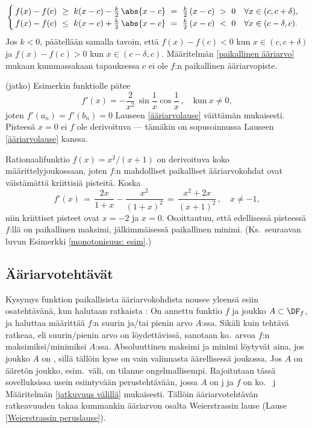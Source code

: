 \[
\begin{cases}
\,f(x)-f(c)\ \ge\ k(x-c) - \frac{k}{2}\,\abs{x-c}
           \ =\ \frac{k}{2}\,(x-c)\ >\ 0 \quad \forall x\in(c,c+\delta), \\
\,f(x)-f(c)\ \le\ k(x-c) + \frac{k}{2}\,\abs{x-c} 
           \ =\ \frac{k}{2}\,(x-c)\ <\ 0 \quad \forall x\in(c-\delta,c).
\end{cases}
\]
Jos $k<0$, päätellään samalla tavoin, että $f(x)-f(c)<0$ kun $x \in (c,c+\delta)$ ja 
$f(x)-f(c)>0$ kun $x \in (c-\delta,c)$. Määritelmän \ref{paikallinen ääriarvo} mukaan 
kummassakaan tapauksessa $c$ ei ole $f$:n paikallinen ääriarvopiste. \loppu
\jatko \begin{Exa} (jatko) Esimerkin funktiolle pätee
\[
f'(x) = -\frac{2}{x^2}\,\sin\frac{1}{x}\cos\frac{1}{x}\,, \quad \text{kun}\ x \neq 0,
\]
joten $f'(a_n)=f'(b_n)=0$ Lauseen \ref{ääriarvolause} väittämän mukaisesti. Pisteesä $x=0$ ei
$f$ ole derivoituva --- tämäkin on sopusoinnussa Lauseen \ref{ääriarvolause} kanssa. \loppu
\end{Exa}
\begin{Exa} \label{kriittiset pisteet: esim} Rationaalifunktio $f(x)=x^2/(x+1)$ on derivoituva
koko määrittelyjoukossaan, joten $f$:n mahdolliset paikalliset ääriarvokohdat ovat väistämättä
kriittisiä pisteitä. Koska
\[
f'(x) \,=\, \frac{2x}{1+x}-\frac{x^2}{(1+x)^2} 
      \,=\, \frac{x^2+2x}{(x+1)^2}\,, \quad x \neq -1,
\]
niin kriittiset pisteet ovat $x=-2$ ja $x=0$. Osoittautuu, että edellisessä pisteessä $f$:llä
on paikallinen maksimi, jälkimmäisessä paikallinen minimi. (Ks.\ seuraavan luvun Esimerkki
\ref{monotonisuus: esim}.) \loppu
\end{Exa}

\subsection*{Ääriarvotehtävät}

Kysymys funktion paikallisista ääriarvokohdista nousee yleensä esiin osatehtävänä, kun halutaan
ratkaista : On annettu funktio $f$ ja joukko $A\subset\DF_f$, ja haluttaa
määrittää $f$:n suurin ja/tai pienin arvo $A$:ssa. Sikäli kuin tehtävä ratkeaa, eli 
suurin/pienin arvo on löydettävissä, sanotaan ko.\ arvoa $f$:n
 
%
 maksimiksi/minimiksi $A$:ssa. Absoluuttinen maksimi ja minimi löytyvät
aina, jos joukko $A$ on , sillä tällöin kyse on vain valinnasta äärellisessä
joukossa. Jos $A$ on ääretön joukko, esim.\ väli, on tilanne ongelmallisempi. Rajoitutaan tässä
sovelluksissa usein esiintyvään perustehtävään, jossa $A$ on j 
ja $f$ on ko.\  j Määritelmän \ref{jatkuvuus välillä} mukaisesti.
Tällöin ääriarvotehtävän ratkeavuuden takaa kummankin ääriarvon osalta Weierstrassin lause
(Lause \ref{Weierstrassin peruslause}).

